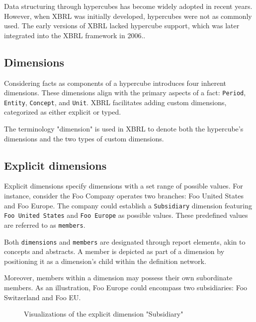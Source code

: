 Data structuring through hypercubes has become widely adopted in recent years.
However, when XBRL was initially developed, hypercubes were not as commonly used.
The early versions of XBRL lacked hypercube support,
which was later integrated into the XBRL framework in 2006.\cite{xbrl_dimensions}.

\subsection{Dimensions}

Considering facts as components of a hypercube introduces four inherent dimensions.
These dimensions align with the primary aspects of a fact: \texttt{Period}, \texttt{Entity}, \texttt{Concept}, and \texttt{Unit}.
XBRL facilitates adding custom dimensions, categorized as either explicit or typed.

The terminology "dimension" is used in XBRL to denote both the hypercube's dimensions and the two types of custom dimensions.

\subsection{Explicit dimensions}

Explicit dimensions specify dimensions with a set range of possible values.
For instance, consider the Foo Company operates two branches: Foo United States and Foo Europe.
The company could establish a \texttt{Subsidiary} dimension featuring \texttt{Foo United States} and \texttt{Foo Europe} as possible values.
These predefined values are referred to as \texttt{members}.

Both \texttt{dimensions} and \texttt{members} are designated through report elements, akin to concepts and abstracts.
A member is depicted as part of a dimension by positioning it as a dimension's child within the definition network.

Moreover, members within a dimension may possess their own subordinate members.
As an illustration, Foo Europe could encompass two subsidiaries: Foo Switzerland and Foo EU.

\begin{figure}[H]
    \label{fig:example_explicit_dimension}
    \caption{Visualizations of the explicit dimension "Subsidiary"}
\end{figure}

